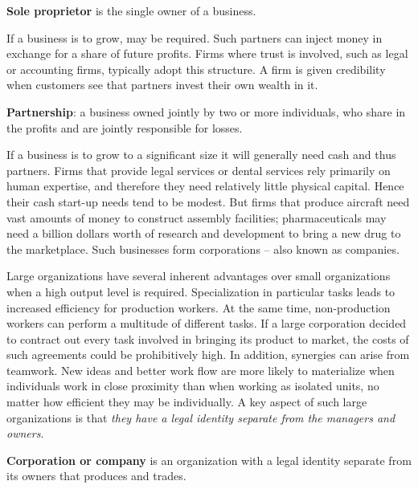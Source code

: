 \begin{DefBox}
\textbf{Sole proprietor} is the single owner of a business.
\end{DefBox}

\newhtmlpage

If a business is to grow,  may be required. Such
partners can inject money in exchange for a share of future profits. Firms
where trust is involved, such as legal or accounting firms, typically adopt
this structure. A firm is given credibility when customers see that partners
invest their own wealth in it.

\begin{DefBox}
\textbf{Partnership}: a business owned jointly by two or more individuals, who share in the profits and are jointly responsible for losses.
\end{DefBox}

If a business is to grow to a significant size it will generally need cash
and thus partners. Firms that provide legal services or dental services rely
primarily on human expertise, and therefore they need relatively little
physical capital. Hence their cash start-up needs tend to be modest. But
firms that produce aircraft need vast amounts of money to construct assembly
facilities; pharmaceuticals may need a billion dollars worth of research and
development to bring a new drug to the marketplace. Such businesses form
corporations -- also known as companies.

Large organizations have several inherent advantages over small
organizations when a high output level is required. Specialization in
particular tasks leads to increased efficiency for production workers. At
the same time, non-production workers can perform a multitude of different
tasks. If a large corporation decided to contract out every task involved in
bringing its product to market, the costs of such agreements could be
prohibitively high. In addition, synergies can arise from teamwork. New
ideas and better work flow are more likely to materialize when individuals
work in close proximity than when working as isolated units, no matter how
efficient they may be individually. A key aspect of such large organizations
is that \textit{they have a legal identity separate from the managers and
owners}.

\begin{DefBox}
\textbf{Corporation or company} is an organization with a legal identity separate from its owners that produces and trades.
\end{DefBox}

